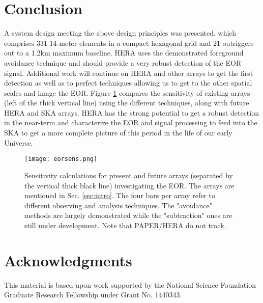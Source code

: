 \documentclass{ICEAA-IEEE_APWC}
\begin{document}
\section{Conclusion}
A system design meeting the above design principles was presented, which comprises 331 14-meter elements in a compact hexagonal grid and 21 outriggers out to a 1.2km maximum baseline.  HERA uses the demonstrated foreground avoidance technique and should provide a very robust detection of the EOR signal.  Additional work will continue on HERA and other arrays to get the first detection as well as to perfect techniques allowing us to get to the other spatial scales and image the EOR.  Figure \ref{fig:eorsense} compares the sensitivity of existing arrays (left of the thick vertical line) using the different techniques, along with future HERA and SKA arrays.  HERA has the strong potential to get a robust detection in the near-term and characterize the EOR and signal processing to feed into the SKA to get a more complete picture of this period in the life of our early Universe.

\begin{figure}[t]
\centerline{
\texttt{[image: eorsens.png]} 
}
\caption{\small Sensitivity calculations for present and future arrays  (separated by the vertical thick black line) investigating the EOR.
The arrays are mentioned in Sec. \ref{sec:intro}.  The four bars per array refer to different observing and analysis techniques.  The "avoidance" 
methods are largely demonstrated while the "subtraction" ones are still under development.  Note that PAPER/HERA do not track.
\label{fig:eorsense}}
\end{figure}
\section*{Acknowledgments}
This material is based upon work supported by the National Science Foundation Graduate Research Fellowship under Grant No. 1440343.


\end{document}
